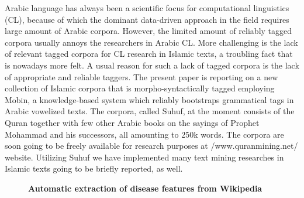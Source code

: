 \documentclass[10pt, a4paper, twopage, headinclude, footinclude, BCOR5mm]{scrartcl}
\begin{document}
\noindent
Arabic language has always been a scientific focus for computational linguistics (CL), because of which the dominant data-driven approach in the field requires large amount of Arabic corpora. However, the limited amount of reliably tagged corpora usually annoys the researchers in Arabic CL. More challenging is the lack of relevant tagged corpora for CL research in Islamic texts, a troubling fact that is nowadays more felt. A usual reason for such a lack of tagged corpora is the lack of appropriate and reliable taggers. The present paper is reporting on a new collection of Islamic corpora that is morpho-syntactically tagged employing Mobin, a knowledge-based system which reliably bootstraps grammatical tags in Arabic vowelized texts. The corpora, called Suhuf, at the moment consists of the Quran together with few other Arabic books on the sayings of Prophet Mohammad and his successors, all amounting to 250k words. The corpora are soon going to be freely available for research purposes at /www.quranmining.net/ website. Utilizing Suhuf we have implemented many text mining researches in Islamic texts going to be briefly reported, as well.


\newpage

\begin{figure}[t!]
\centering
\large\textbf{Automatic extraction of disease features from Wikipedia}
\vspace*{0.5cm}
\end{figure}


        \begin{table}[t!]
    \end{table}
        \begin{table}[t!]
    \end{table}
\end{document}
